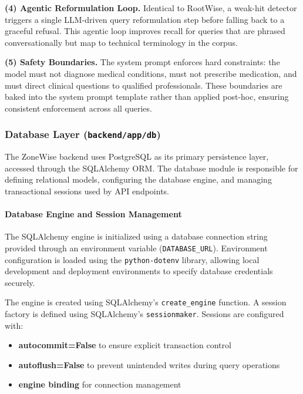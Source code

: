\documentclass[11pt,twocolumn]{article}
\begin{document}
\textbf{(4) Agentic Reformulation Loop.} Identical to RootWise, a weak-hit detector triggers a single LLM-driven query reformulation step before falling back to a graceful refusal. This agentic loop improves recall for queries that are phrased conversationally but map to technical terminology in the corpus.

\textbf{(5) Safety Boundaries.} The system prompt enforces hard constraints: the model must not diagnose medical conditions, must not prescribe medication, and must direct clinical questions to qualified professionals. These boundaries are baked into the system prompt template rather than applied post-hoc, ensuring consistent enforcement across all queries.

\subsubsection{Database Layer (\texttt{backend/app/db})}

The ZoneWise backend uses PostgreSQL as its primary persistence layer, accessed through the SQLAlchemy ORM. The database module is responsible for defining relational models, configuring the database engine, and managing transactional sessions used by API endpoints.

\paragraph{Database Engine and Session Management}

The SQLAlchemy engine is initialized using a database connection string provided through an environment variable (\texttt{DATABASE\_URL}). Environment configuration is loaded using the \texttt{python-dotenv} library, allowing local development and deployment environments to specify database credentials securely.

The engine is created using SQLAlchemy's \texttt{create\_engine} function. A session factory is defined using SQLAlchemy's \texttt{sessionmaker}. Sessions are configured with:

\begin{itemize}
\item \textbf{autocommit=False} to ensure explicit transaction control
\item \textbf{autoflush=False} to prevent unintended writes during query operations
\item \textbf{engine binding} for connection management
\end{itemize}
\end{document}
